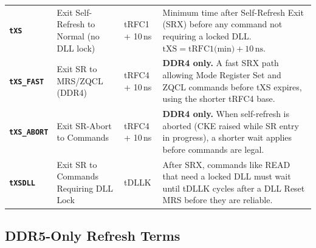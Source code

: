 \documentclass[11pt,a4paper]{article}
\newcommand{\sym}[1]{\texttt{\textbf{#1}}}
\begin{document}
\begin{longtable}{L{2.2cm} L{4.8cm} L{3.5cm} L{4cm}}
\sym{tXS} & Exit Self-Refresh to Normal (no DLL lock) & tRFC1 + 10\,ns &
  Minimum time after Self-Refresh Exit (SRX) before any command not requiring a locked DLL.
  $\text{tXS} = \text{tRFC1(min)} + 10\,\text{ns}$. \\

\sym{tXS\_FAST} & Exit SR to MRS/ZQCL (DDR4) & tRFC4 + 10\,ns &
  \textbf{DDR4 only.} A fast SRX path allowing Mode Register Set and ZQCL commands
  before tXS expires, using the shorter tRFC4 base. \\

\sym{tXS\_ABORT} & Exit SR-Abort to Commands & tRFC4 + 10\,ns &
  \textbf{DDR4 only.} When self-refresh is aborted (CKE raised while SR entry in progress),
  a shorter wait applies before commands are legal. \\

\sym{tXSDLL} & Exit SR to Commands Requiring DLL Lock & tDLLK &
  After SRX, commands like READ that need a locked DLL must wait until tDLLK cycles
  after a DLL Reset MRS before they are reliable. \\

\end{longtable}

\subsection{DDR5-Only Refresh Terms}
\end{document}
